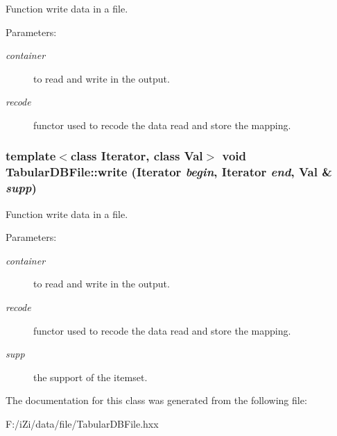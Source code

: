Function write data in a file. 

\begin{Desc}
\item[Parameters:]
\begin{description}
\item[{\em container}]to read and write in the output. \item[{\em recode}]functor used to recode the data read and store the mapping. \end{description}
\end{Desc}
\subsubsection{\setlength{\rightskip}{0pt plus 5cm}template$<$class Iterator, class Val$>$ void Tabular\-DBFile::write (Iterator {\em begin}, Iterator {\em end}, Val \& {\em supp})\hspace{0.3cm}{\tt  [protected]}}\label{class_tabular_d_b_file_b6c2a304ce4003222dd2e89b9d933765}


Function write data in a file. 

\begin{Desc}
\item[Parameters:]
\begin{description}
\item[{\em container}]to read and write in the output. \item[{\em recode}]functor used to recode the data read and store the mapping. \item[{\em supp}]the support of the itemset. \end{description}
\end{Desc}


The documentation for this class was generated from the following file:\begin{CompactItemize}
\item 
F:/i\-Zi/data/file/Tabular\-DBFile.hxx\end{CompactItemize}
